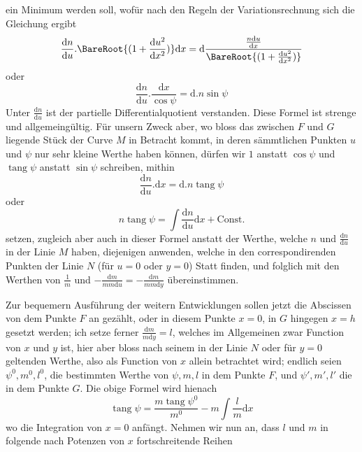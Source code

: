 %
ein Minimum werden soll, wofür nach den Regeln der Variationsrechnung sich die Gleichung ergibt
\[
\frac{\mathrm{d}n}{\mathrm{d}u}\mathord{.}\BareRoot{(1+\frac{\mathrm{d}u^2}{\mathrm{d}x^2})}\mathrm{d}x=\mathrm{d}\frac{\frac{n\mathrm{d}u}{\mathrm{d}x}}{\BareRoot{(1+\frac{\mathrm{d}u^2}{\mathrm{d}x^2})}}
\]
oder
\[
\frac{\mathrm{d}n}{\mathrm{d}u}\mathord{.}\frac{\mathrm{d}x}{\cos\psi}=\mathrm{d}\mathord{.}n\sin\psi
\]
Unter \(\tfrac{\mathrm{d}n}{\mathrm{d}u}\) ist der partielle Differentialquotient verstanden. Diese Formel ist strenge und allgemeingültig. Für unsern Zweck aber, wo bloss das zwischen \(F\) und \(G\) liegende Stück der Curve \(M\) in Betracht kommt, in deren sämmtlichen Punkten \(u\) und \(\psi\) nur sehr kleine Werthe haben können, dürfen wir \(1\) anstatt \(\cos\psi\) und \(\operatorname{tang}\psi\) anstatt \(\sin\psi\) schreiben, mithin
\[
\frac{\mathrm{d}n}{\mathrm{d}u}\mathord{.}\mathrm{d}x=\mathrm{d}\mathord{.}n\operatorname{tang}\psi
\]
oder
\[
n\operatorname{tang}\psi=\int\frac{\mathrm{d}n}{\mathrm{d}u}\mathrm{d}x+\text{Const.}
\]
setzen, zugleich aber auch in dieser Formel anstatt der Werthe, welche \(n\) und \(\tfrac{\mathrm{d}n}{\mathrm{d}u}\) in der Linie \(M\) haben, diejenigen anwenden, welche in den correspondirenden Punkten der Linie \(N\) (für \(u=0\) oder \(y=0\)) Statt finden, und folglich mit den Werthen von \(\tfrac{1}{m}\) und \(-\tfrac{\mathrm{d}m}{mm\mathrm{d}u}=-\tfrac{\mathrm{d}m}{mm\mathrm{d}y}\) übereinstimmen.

Zur bequemern Ausführung der weitern Entwicklungen sollen jetzt die Abscissen von dem Punkte \(F\) an gezählt, oder in diesem Punkte \(x=0\), in \(G\) hingegen \(x=h\) gesetzt werden; ich setze ferner \(\tfrac{\mathrm{d}m}{m\mathrm{d}y}=l\), welches im Allgemeinen zwar Function von \(x\) und \(y\) ist, hier aber bloss nach seinem in der Linie \(N\) oder für \(y=0\) geltenden Werthe, also als Function von \(x\) allein betrachtet wird; endlich seien \(\psi^0,m^0,l^0\), die bestimmten Werthe von \(\psi,m,l\) in dem Punkte \(F\), und \(\psi',m',l'\) die in dem Punkte \(G\). Die obige Formel wird hienach
\[
\operatorname{tang}\psi=\frac{m\operatorname{tang}\psi^0}{m^0}-m\int\frac{l}{m}\mathrm{d}x
\]
wo die Integration von \(x=0\) anfängt. Nehmen wir nun an, dass \(l\) und \(m\) in folgende nach Potenzen von \(x\) fortschreitende Reihen
